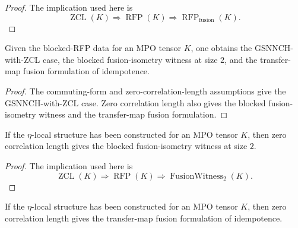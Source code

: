 \begin{proof}\leanok
    The implication used here is
    \[
        \operatorname{ZCL}(K)
        \Longrightarrow \operatorname{RFP}(K)
        \Longrightarrow \operatorname{RFP}_{\mathrm{fusion}}(K).
    \]
\end{proof}

\begin{theorem}
    \label{thm:simple_mpdo_rfp_chain_of_data}
    \leanok
    Given the blocked-RFP data for an MPO tensor $K$, one obtains the
    GSNNCH-with-ZCL case, the blocked fusion-isometry witness at size $2$, and
    the transfer-map fusion formulation of idempotence.
\end{theorem}

\begin{proof}\leanok
    The commuting-form and zero-correlation-length assumptions give the
    GSNNCH-with-ZCL case. Zero correlation length also gives the blocked
    fusion-isometry witness and the transfer-map fusion formulation.
\end{proof}

\begin{lemma}
    \label{lem:eta_local_structure_fusion_isometry_two}
    \leanok
    If the $\eta$-local structure has been constructed for an MPO tensor $K$,
    then zero correlation length gives the blocked fusion-isometry witness at
    size $2$.
\end{lemma}

\begin{proof}\leanok
    The implication used here is
    \[
        \operatorname{ZCL}(K)
        \Longrightarrow \operatorname{RFP}(K)
        \Longrightarrow \operatorname{FusionWitness}_{2}(K).
    \]
\end{proof}

\begin{lemma}
    \label{lem:eta_local_structure_rfp_via_fusion}
    \leanok
    If the $\eta$-local structure has been constructed for an MPO tensor $K$,
    then zero correlation length gives the transfer-map fusion formulation of
    idempotence.
\end{lemma}

